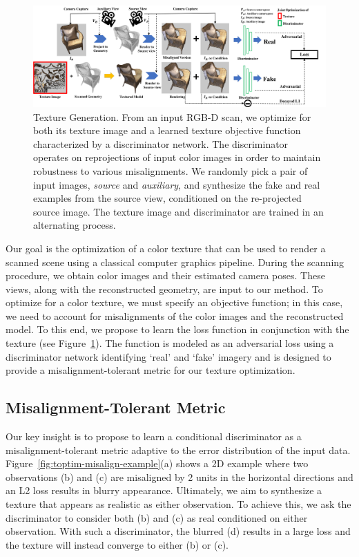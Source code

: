 \begin{figure}
    \centering
    \includegraphics[width=\linewidth]{texturegen/figures/pipeline.png}
    \caption{Texture Generation. 
    From an input RGB-D scan, we optimize for both its texture image and a learned texture objective function characterized by a discriminator network. 
    The discriminator operates on reprojections of input color images in order to maintain robustness to various misalignments.
    We randomly pick a pair of input images, \emph{source} and \emph{auxiliary}, and synthesize the fake and real examples from the source view, conditioned on the re-projected source image. 
    The texture image and discriminator are trained in an alternating process.}
    \label{fig:toptim-pipeline}
\end{figure}

Our goal is the optimization of a color texture that can be used to render a scanned scene using a classical computer graphics pipeline.
%
During the scanning procedure, we obtain color images and their estimated camera poses.
%
These views, along with the reconstructed geometry, are input to our method.
%
To optimize for a color texture, we must specify an objective function; in this case, we need to account for misalignments of the color images and the reconstructed model.
%
To this end, we propose to learn the loss function in conjunction with the texture (see Figure~\ref{fig:toptim-pipeline}).
%
The function is modeled as an adversarial loss using a discriminator network identifying `real' and `fake' imagery and is designed to provide a misalignment-tolerant metric for our texture optimization.
%

\subsection{Misalignment-Tolerant Metric}
\label{sec:approach-misalign}



%
Our key insight is to propose to learn a conditional discriminator as a misalignment-tolerant metric adaptive to the error distribution of the input data.
%
Figure~\ref{fig:toptim-misalign-example}(a) shows a 2D example where two observations (b) and (c) are misaligned by 2 units in the horizontal directions and an L2 loss results in blurry appearance.
%
Ultimately, we aim to synthesize a texture that appears as realistic as either observation.
%
To achieve this, we ask the discriminator to consider both (b) and (c) as real conditioned on either observation.
%
With such a discriminator, the blurred (d) results in a large loss and the texture will instead converge to either (b) or (c).
%

